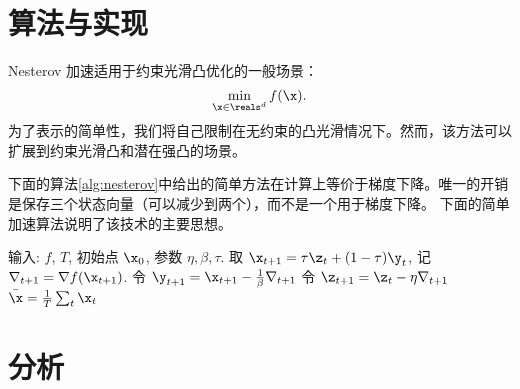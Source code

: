 \section{
    算法与实现
    }

Nesterov 加速适用于约束光滑凸优化的一般场景：
\begin{equation} \label{eqn:shalom5}
\min_{\x \in \reals^d} f(\x) .
\end{equation}
为了表示的简单性，我们将自己限制在无约束的凸光滑情况下。然而，该方法可以扩展到约束光滑凸和潜在强凸的场景。

下面的算法\ref{alg:nesterov}中给出的简单方法在计算上等价于梯度下降。唯一的开销是保存三个状态向量（可以减少到两个），而不是一个用于梯度下降。
下面的简单加速算法说明了该技术的主要思想。

\begin{algorithm}[h!]
\caption{
    简化的Nesterov加速
    }
\label{alg:nesterov}
\begin{algorithmic}[1]
\STATE 输入: $f$, $T$, 初始点 $\x_0 $, 参数 $\eta,\beta,\tau$. 
\STATE 取 $\x_{t+1} = \tau \z_t + (1-\tau) \y_t $, 记 $\nabla_{t+1} = \nabla f(\x_{t+1}) $.
\STATE 令 $ \y_{t+1} = \x_{t+1} - \frac{1}{\beta} {\nabla}_{t+1}   $
\STATE 令 $\z_{t+1}=  \z_{t} - \eta \nabla_{t+1} $
\ENDFOR
\RETURN $\bar{\x} = \frac{1}{T} \sum_t \x_t  $ 
\end{algorithmic}
\end{algorithm}


\section{
    分析
    } 

